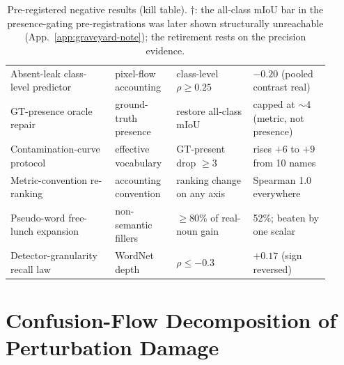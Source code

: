 \documentclass[11pt]{article}
\newcommand{\miou}{mIoU}
\begin{document}
\begin{table}[t]
\begin{tabular}{p{0.30\linewidth}p{0.17\linewidth}p{0.22\linewidth}p{0.22\linewidth}}
Absent-leak class-level predictor & pixel-flow accounting & class-level $\rho\ge0.25$ & $-0.20$ (pooled contrast real) \\
GT-presence oracle repair & ground-truth presence & restore all-class \miou{} & capped at $\sim$4 (metric, not presence) \\
Contamination-curve protocol & effective vocabulary & GT-present drop $\ge3$ & rises $+6$ to $+9$ from 10 names \\
Metric-convention re-ranking & accounting convention & ranking change on any axis & Spearman 1.0 everywhere \\
Pseudo-word free-lunch expansion & non-semantic fillers & $\ge$80\% of real-noun gain & 52\%; beaten by one scalar \\
Detector-granularity recall law & WordNet depth & $\rho\le-0.3$ & $+0.17$ (sign reversed) \\
\bottomrule
\end{tabular}
\caption{Pre-registered negative results (kill table). $\dagger$: the
all-class \miou{} bar in the presence-gating pre-registrations was later
shown structurally unreachable (App.~\ref{app:graveyard-note}); the
retirement rests on the precision evidence.}
\label{tab:killtable}
\end{table}

\section{Confusion-Flow Decomposition of Perturbation Damage}
\label{app:badecomp}
\end{document}
